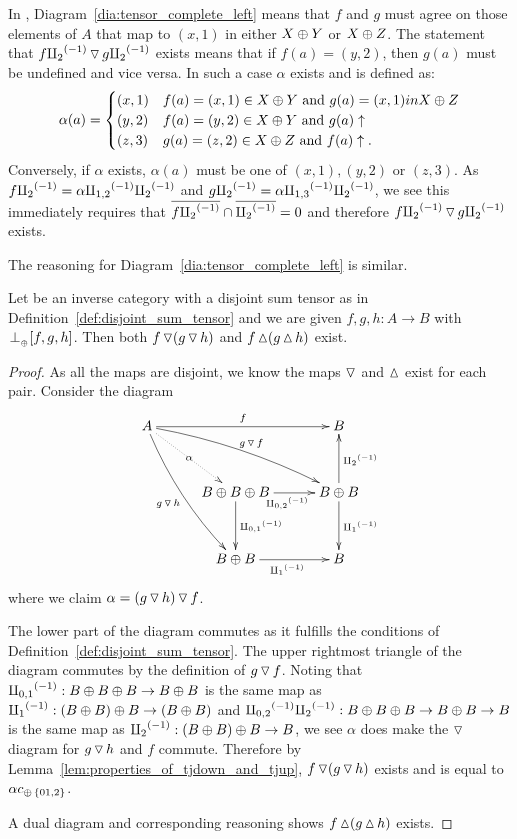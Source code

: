 \begin{example}\label{ex:pinj_has_disjoint_sum_tensor}
  In \pinj, Diagram~\ref{dia:tensor_complete_left} means that $f$ and $g$ must agree on those
  elements of $A$ that map to $(x,1)$ in either $X\oplus Y$ or $X\oplus Z$. The statement that
  $f {\amalg_{2}}^{(-1)}  \operatorname{\triangledown} g {\amalg_{2}}^{(-1)}$ exists means that if $f(a) = (y,2)$, then $g(a)$ must be undefined and
  vice versa. In such a case $\alpha$ exists and is defined as:
  \[
     \alpha(a) = \begin{cases}
       (x,1) & f(a) = (x,1)\in X\oplus Y \text{ and }g(a) = (x,1) in X\oplus Z\\
       (y,2) & f(a) = (y,2)\in X\oplus Y \text{ and }g(a) \uparrow\\
       (z,3) & g(a) = (z,2)\in X\oplus Z \text{ and }f(a) \uparrow.
       \end{cases}
 \]
 Conversely, if $\alpha$ exists, $\alpha(a)$ must be one of $(x,1), (y,2)$ or $(z,3)$. As
 $f{\amalg_{2}}^{(-1)} = \alpha{\amalg_{1,2}}^{(-1)}{\amalg_{2}}^{(-1)}$ and $g{\amalg_{2}}^{(-1)} = \alpha{\amalg_{1,3}}^{(-1)}{\amalg_{2}}^{(-1)}$, we see this immediately
 requires that $\overline{f{\amalg_{2}}^{(-1)}}\cap\overline{{\amalg_{2}}^{(-1)}} =0$ and therefore $f {\amalg_{2}}^{(-1)}  \operatorname{\triangledown} g {\amalg_{2}}^{(-1)}$ exists.

 The reasoning for Diagram~\ref{dia:tensor_complete_left} is similar.
\end{example}
\begin{lemma}\label{lem:complete_disjointness_means_multiple_disjoints}
  Let \X be an inverse category with a disjoint sum tensor as in
  Definition~\ref{def:disjoint_sum_tensor} and we are given $f,g,h:A\to B$ with
  ${}_{{}_{}}{\perp_{{}_{\oplus}}}[f,g,h]$. Then both $f \operatorname{\triangledown} (g \operatorname{\triangledown} h)$ and $f\operatorname{\vartriangle}(g\operatorname{\vartriangle} h)$ exist.
\end{lemma}
\begin{proof}
  As all the maps are disjoint, we know the maps $\operatorname{\triangledown}$ and $\operatorname{\vartriangle}$ exist for each pair.
  Consider the diagram
  \[
    \xymatrix@C+5pt@R+10pt{
      A \ar@/_/[ddr]_{g\tjdown h} \ar@/^/[drr]^{g\tjdown f} \ar@{.>}[dr]|-{\alpha} \ar[rr]^{f}
        & & B \\
        & B\+B\+B \ar[d]^{\icp{0,1}} \ar[r]_{\icp{0,2}} & B\+B \ar[d]^{\icpa} \ar[u]_{\icpb} \\
        & B\+B \ar[r]_{\icpa} & B
    }
  \]
  where we claim $\alpha = (g\operatorname{\triangledown} h)\operatorname{\triangledown} f$.

  The lower part of the diagram commutes as it fulfills the conditions of
  Definition~\ref{def:disjoint_sum_tensor}. The upper rightmost triangle of the diagram commutes by
  the definition of $g\operatorname{\triangledown} f$. Noting that ${\amalg_{0,1}}^{(-1)}:B\oplus B\oplus B \to B\oplus B$ is the same map as
  ${\amalg_{1}}^{(-1)}:(B\oplus B)\oplus B\to (B\oplus B)$ and ${\amalg_{0,2}}^{(-1)} {\amalg_{2}}^{(-1)}:B\oplus B\oplus B \to B\oplus B \to B$ is the same map as
  ${\amalg_{2}}^{(-1)}:(B\oplus B)\oplus B\to B$, we see $\alpha$ does make the $\operatorname{\triangledown}$ diagram for $g\operatorname{\triangledown} h$ and $f$
  commute. Therefore by Lemma~\ref{lem:properties_of_tjdown_and_tjup}, $f\operatorname{\triangledown}(g\operatorname{\triangledown} h)$
  exists and is equal to $\alpha c_{\oplus\,\{01,2\}}$.

  A dual diagram and corresponding reasoning shows $f\operatorname{\vartriangle}(g\operatorname{\vartriangle} h)$ exists.
\end{proof}

